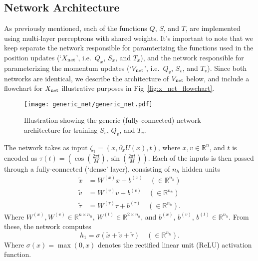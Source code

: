 \documentclass[../main.tex]{subfiles}
\begin{document}
\subsection{Network Architecture}%
\label{subsec:l2hmc_network}
As previously mentioned, each of the functions $Q$, $S$, and $T$, are implemented using multi-layer perceptrons with
shared weights.
%
It's important to note that we keep separate the network responsible for paramterizing the functions used in the
position updates (`${X_{\mathrm{net}}}$', i.e.\ $Q_x$, $S_x$, and $T_x$), and the network responsible for parameterizing the
momentum updates (`${V_{\mathrm{net}}}$', i.e.\ $Q_v$, $S_v$, and $T_v$).
%
Since both networks are identical, we describe the architecture of ${V_{\mathrm{net}}}$ below, and include a flowchart for ${X_{\mathrm{net}}}$ 
illustrative purposes in Fig~\ref{fig:x_net_flowchart}.
%
%
\begin{figure}[htpb]
  \centering
  \texttt{[image: generic\_net/generic\_net.pdf]}
  \caption{Illustration showing the generic (fully-connected) network architecture for training $S_v$, $Q_v$, and
  $T_v$.}%
\label{fig:generic_net}
\end{figure}
%
%
%
The network takes as input $\zeta_1 = (x, \partial_{x} U(x), t)$, where $x, v \in \mathbb{R}^{n}$, and $t$ is encoded
as $\tau(t) = \left(\cos{(\frac{2\pi t}{M})},\right.  \left.\sin{(\frac{2\pi t}{M})}\right)$.
%
Each of the inputs is then passed through a fully-connected (`dense' layer), consisting of $n_h$ hidden units
%
\begin{align}
    \tilde x &= W^{(x)} x + b^{(x)} \quad (\in \mathbb{R}^{n_h})\\
    \tilde v &= W^{(v)} v + b^{(v)} \quad (\in \mathbb{R}^{n_h})\\
    \tilde \tau &= W^{(\tau)} \tau + b^{(\tau)} \quad (\in \mathbb{R}^{n_h}).
\end{align}
%
Where $W^{(x)}, W^{(v)} \in \mathbb{R}^{n \times n_h}$, $W^{(t)} \in \mathbb{R}^{2 \times n_h}$, and $b^{(x)}$,
$b^{(v)}$,  $b^{(t)} \in \mathbb{R}^{n_h}$.
%
From these, the network computes
%
\begin{equation}
    h_1 = \sigma(\tilde x + \tilde v + \tilde \tau) \quad (\in
    \mathbb{R}^{n_h}).
    \label{eq:hidden_1}
\end{equation}
%
Where $\sigma(x) = \max(0, x)$ denotes the rectified linear unit (ReLU) activation function.
\end{document}
